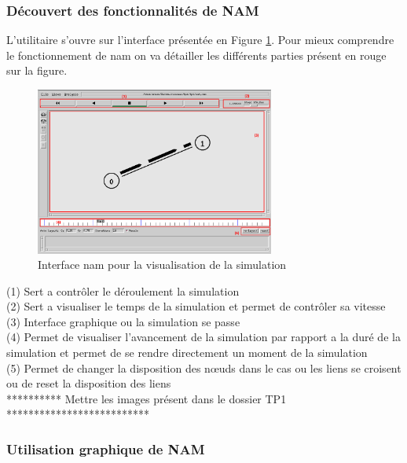 \documentclass[11pt]{article}
\begin{document}
\subsubsection{Découvert des fonctionnalités de NAM}
L'utilitaire s'ouvre sur l'interface présentée en Figure \ref{namVisu}. Pour mieux comprendre le fonctionnement de nam on va détailler les différents parties présent en rouge sur la figure.

\begin{figure}[H]
	\begin{center}
		\includegraphics[width=0.7\textwidth]{assets/tp1/nam-visualisation1.png}
	\end{center}
	\caption{Interface nam pour la visualisation de la simulation}
	\label{namVisu}
\end{figure}

\noindent
(1) Sert a contrôler le déroulement la simulation \\
(2) Sert a visualiser le temps de la simulation et permet de contrôler sa vitesse\\
(3) Interface graphique ou la simulation se passe \\
(4) Permet de visualiser l'avancement de la simulation par rapport a la duré de la simulation et permet de se rendre directement un moment de la simulation\\
(5) Permet de changer la disposition des nœuds dans le cas ou les liens se croisent ou de reset la disposition des liens\\


********** Mettre les images présent dans le dossier TP1 **************************

\subsubsection{Utilisation graphique de NAM}
\end{document}
